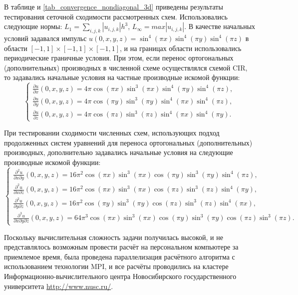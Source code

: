 \documentclass[11pt]{article}
\begin{document}
В таблице и \ref{tab_convergence_nondiagonal_3d} приведены результаты тестирования сеточной сходимости рассмотренных схем.
Использовались следующие нормы: $L_1 = \sum\limits_{i, j, k} |u_{i, j, k}|h^3$, $L_{\infty} = max |u_{i, j,k}|$.
В качестве начальных условий задавался импульс $u(0, x, y, z) = \sin^4(\pi x)\sin^4(\pi y)\sin^4(\pi z)$ в области $[-1,1]\times[-1,1]\times[-1,1]$, и на границах области использовались периодические граничные условия.
При этом, если перенос ортогональных (дополнительных) производных в численной схеме осуществлялся схемой CIR, то задавались начальные условия на частные производные искомой функции:
\begin{equation}
\label{eq_partial_derivatives}
\begin{cases}
\frac{\partial u}{\partial x} (0, x, y, z) = 4\pi\cos(\pi x)\sin^3(\pi x)\sin^4(\pi y)\sin^4(\pi z), \\
\frac{\partial u}{\partial y} (0, x, y, z) = 4\pi\cos(\pi y)\sin^3(\pi y)\sin^4(\pi x)\sin^4(\pi z), \\
\frac{\partial u}{\partial z} (0, x, y, z) = 4\pi\cos(\pi z)\sin^3(\pi z)\sin^4(\pi x)\sin^4(\pi y).
\end{cases}
\end{equation}

При тестировании сходимости численных схем, использующих подход продолженных систем уравнений для переноса ортогональных (дополнительных) производных, дополнительно задавались начальные условия на следующие производные искомой функции:
\begin{equation}
\label{eq_cross_derivative}
\begin{cases}
\frac{\partial^2 u}{\partial x \partial y} (0, x, y, z) = 16\pi^2\cos(\pi x)\sin^3(\pi x)\cos(\pi y)\sin^3(\pi y)\sin^4(\pi z), \\
\frac{\partial^2 u}{\partial x \partial z} (0, x, y, z) = 16\pi^2\cos(\pi x)\sin^3(\pi x)\cos(\pi z)\sin^3(\pi z)\sin^4(\pi y), \\
\frac{\partial^2 u}{\partial y \partial z} (0, x, y, z) = 16\pi^2\cos(\pi y)\sin^3(\pi y)\cos(\pi z)\sin^3(\pi z)\sin^4(\pi x), \\
\frac{\partial^3 u}{\partial x \partial y \partial z} (0, x, y, z) = 64\pi^3\cos(\pi x)\sin^3(\pi x)\cos(\pi y)\sin^3(\pi y)\cos(\pi z)\sin^3(\pi z).
\end{cases}
\end{equation}

Поскольку вычислительная сложность задачи получилась высокой, и не представлялось возможным провести расчёт на персональном компьютере за приемлемое время, была проведена параллелизация расчётного алгоритма с использованием технологии MPI, и все расчёты проводились на кластере Информационно-вычислительного центра Новосибирского государственного университета \href{http://www.nusc.ru/}{http://www.nusc.ru/}.
\end{document}
